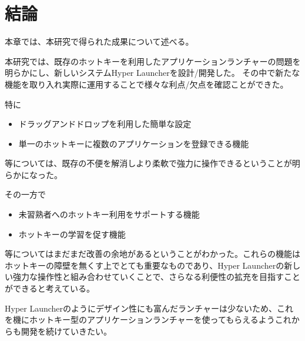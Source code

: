 \chapter{結論}
本章では、本研究で得られた成果について述べる。

\newpage

本研究では、既存のホットキーを利用したアプリケーションランチャーの問題を明らかにし、新しいシステムHyper Launcherを設計/開発した。
その中で新たな機能を取り入れ実際に運用することで様々な利点/欠点を確認ことができた。

特に
\begin{itemize}
  \item ドラッグアンドドロップを利用した簡単な設定
  \item 単一のホットキーに複数のアプリケーションを登録できる機能
\end{itemize}
等については、既存の不便を解消しより柔軟で強力に操作できるということが明らかになった。

その一方で
\begin{itemize}
  \item 未習熟者へのホットキー利用をサポートする機能
  \item ホットキーの学習を促す機能
\end{itemize}
等についてはまだまだ改善の余地があるということがわかった。これらの機能はホットキーの障壁を無くす上でとても重要なものであり、Hyper Launcherの新しい強力な操作性と組み合わせていくことで、さらなる利便性の拡充を目指すことができると考えている。

Hyper Launcherのようにデザイン性にも富んだランチャーは少ないため、これを機にホットキー型のアプリケーションランチャーを使ってもらえるようこれからも開発を続けていきたい。